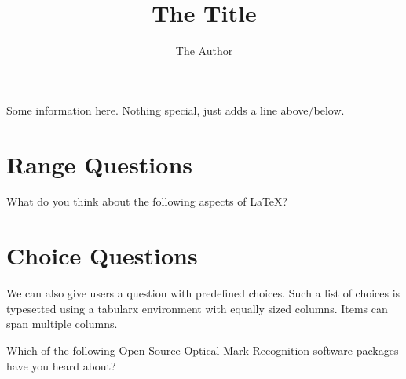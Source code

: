 \documentclass[
  english,
  pagemark,
  stamp]{sdaps}
\author{The Author}
\title{The Title}
\begin{document}

  \begin{questionnaire}
    \begin{info}
      Some information here. Nothing special, just adds a line above/below.
    \end{info}


    \section{Range Questions}


    \begin{markgroup}{What do you think about the following aspects of \LaTeX?}
    \end{markgroup}

    \section{Choice Questions}
    We can also give users a question with predefined choices. Such a list
    of choices is typesetted using a tabularx environment with equally
    sized columns. Items can span multiple columns.

    \begin{choicequestion}[3]{Which of the following Open Source
                              Optical Mark Recognition software
                              packages have you heard about?}


\end{choicequestion}
\end{questionnaire}
\end{document}

